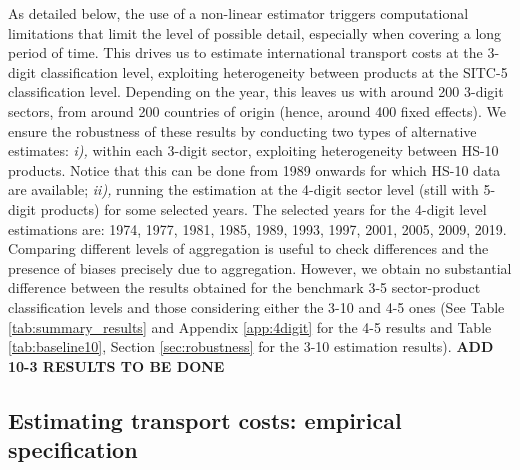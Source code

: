 \documentclass[a4paper,11pt]{article}
\begin{document}
As detailed below, the use of a non-linear estimator triggers computational limitations that limit the level of possible detail, especially when covering a long period of time. This drives us to estimate international transport costs at the 3-digit classification level, exploiting heterogeneity between products at the SITC-5 classification level. Depending on the year, this leaves us with around 200 3-digit sectors, from around 200 countries of origin (hence, around 400 fixed effects). We ensure the robustness of these results by conducting two types of alternative estimates: \textit{i),} within each 3-digit sector, exploiting heterogeneity between HS-10 products. Notice that this can be done from 1989 onwards for which HS-10 data are available; \textit{ii),} running the estimation at the 4-digit sector level (still with 5-digit products) for some selected years. The selected years for the 4-digit level estimations are: 1974, 1977, 1981, 1985, 1989, 1993, 1997, 2001, 2005, 2009, 2019. Comparing different levels of aggregation is useful to check differences and the presence of biases precisely due to aggregation. However, we obtain no substantial difference between the results obtained for the benchmark 3-5 sector-product classification levels and those considering either the 3-10 and 4-5 ones (See Table \ref{tab:summary_results} and Appendix \ref{app:4digit} for the 4-5 results and Table \ref{tab:baseline10}, Section \ref{sec:robustness} for the 3-10 estimation results). \textbf{ADD 10-3 RESULTS TO BE DONE}



\subsection{Estimating transport costs: empirical specification \label{sec:estimation_strat}}
\end{document}
